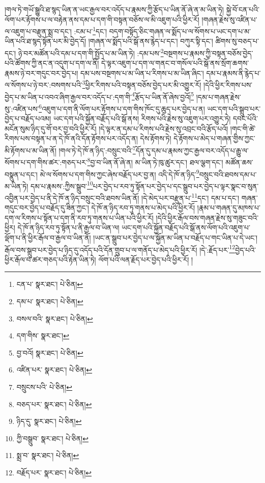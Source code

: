།གལ་ཏེ་གཡོ་སྒྱུའི་ཐ་སྙད་ཡིན་ན་ཡང་རྒྱལ་བར་འདོད་པ་རྣམས་ཀྱི་རྩོད་པ་ཡིན་ནོ་ཞེ་ན་མ་ཡིན་ཏེ། སྐྱེ་བོ་ངན་པའི་ལོག་པར་རྟོགས་པ་ལ་བརྟེན་ནས་དམ་པ་དག་གི་བསྟན་བཅོས་ལ་མི་འཇུག་པའི་ཕྱིར་རོ། །གཞན་རྗེས་སུ་འཛིན་པ་ལ་འཇུག་པ་བརྫུན་སྨྲ་བ་དང་། :ངམ་པ་\footnote{ངན་པ་  སྣར་ཐང་།  པེ་ཅིན། }དང་། བདག་བསྟོད་ཅིང་གཞན་ལ་སྨོད་པ་ལ་སོགས་པ་ཡང་དག་པ་མ་ཡིན་པའི་ཐ་སྙད་སྟོན་པར་མི་བྱེད་དོ། །གཞན་ལ་སྨོད་པའི་སྒོ་ནས་རྙེད་པ་དང་། བཀུར་སྟི་དང་། ཚིགས་སུ་བཅད་པ་དང་། ཉེ་བར་མཚོན་པའི་དམ་པ་དག་གི་སྤྱོད་པ་མ་ཡིན་ཏེ། :དམ་པས་\footnote{དམ་པ་  སྣར་ཐང་།  པེ་ཅིན། }བསྔགས་པ་རྣམས་ཀྱི་བསྟན་བཅོས་བྱེད་པའི་ཚོགས་ཀྱི་ནང་ན་འདུག་པ་དག་ལ་ནི། དེ་ལྟར་འཇུག་པ་དག་ལ་གནང་བ་གསོལ་པའི་སྒོ་ནས་སྲོག་ཆགས་རྣམས་ཉེ་བར་གདུང་བར་བྱེད་པ། དམ་པས་བསྔགས་པ་མ་ཡིན་པ་རིགས་པ་མ་ཡིན་ཞིང་། དམ་པ་རྣམས་ནི་རྙེད་པ་ལ་སོགས་པ་ཉེ་བར་:བསགས་པའི་\footnote{བསལ་བའི་  སྣར་ཐང་།  པེ་ཅིན། }ཕྱིར་རིགས་པའི་བསྟན་བཅོས་བྱེད་པར་མི་འགྱུར་རོ། །དེའི་ཕྱིར་རིགས་པས་བྱེད་པ་མ་ཡིན་པ་འབའ་ཞིག་རྒྱལ་བར་འདོད་པ་:དག་གི་\footnote{དག་གིས་  སྣར་ཐང་། }རྩོད་པ་ཡིན་ནོ་ཞེས་བྱའོ།\footnote{བྱ་བའོ།  སྣར་ཐང་།  པེ་ཅིན། } །དམ་པ་གཞན་རྗེས་སུ་:འཛིན་པས་\footnote{འཛིན་པར་  སྣར་ཐང་།  པེ་ཅིན། }འཇུག་པ་དག་ནི་ལོག་པར་རྟོགས་པ་དག་གིས་ཁོང་དུ་ཆུད་པར་བྱེད་པ་ན། ཡང་དག་པའི་སྒྲུབ་པར་བྱེད་པ་བརྗོད་པའམ། ཡང་དག་པའི་སྐྱོན་བརྗོད་པའི་སྒོ་ནས། རིགས་པའི་རྗེས་སུ་འཇུག་པར་འགྱུར་ཏེ། དབང་པོའི་མངོན་སུམ་ཉིད་དུ་གོ་བར་བྱ་བའི་ཕྱིར་རོ། །དེ་ལྟར་ན་དམ་པ་རིགས་པའི་རྗེས་སུ་འབྲང་བའི་རྩོད་པའོ། །གང་གི་ཚེ་རིགས་པས་བསྟན་པ་ན་དེ་ཁོ་ནའི་དོན་རྟོགས་པར་འདོད་ན། དེས་རྟོགས་ཏེ། དེ་རྟོགས་པ་མེད་པ་གཞན་གྱིས་ཀྱང་མི་རྟོགས་པ་མ་ཡིན་ནོ། །གལ་ཏེ་དེ་ཁོ་ན་ཉིད་:བསྲུང་བའི་\footnote{བསྲུངས་པའི་  པེ་ཅིན། }དོན་དུ་དམ་པ་རྣམས་ཀྱང་རྒྱལ་བར་འདོད་པ་རྒྱུ་ལ་སོགས་པ་དག་གིས་ཚར་:གཅད་པར་\footnote{བཅད་པར་  སྣར་ཐང་།  པེ་ཅིན། }བྱ་བ་ཡིན་ནོ་ཞེ་ན། མ་ཡིན་ཏེ་ཁུ་ཚུར་དང་། ཐལ་ལྕག་དང་། མཚོན་ཆས་བསྣུན་པ་དང་། མེ་ལ་སོགས་པ་དག་གིས་ཀྱང་ཞེས་བརྗོད་པར་བྱ་ན། འདི་དེ་ཁོ་ན་ཉིད་\footnote{ཉིད་དུ་  སྣར་ཐང་།  པེ་ཅིན། }བསྲུང་བའི་ཐབས་དམ་པ་མ་ཡིན་ཏེ། དམ་པ་རྣམས་:ཀྱིས་སྒྲུབ་\footnote{ཀྱི་བསྒྲུབ་  སྣར་ཐང་།  པེ་ཅིན། }པར་བྱེད་པ་རབ་ཏུ་སྟོན་པར་བྱེད་པ་དང་སྒྲུབ་པར་བྱེད་པ་ལྟར་སྣང་བ་སུན་འབྱིན་པར་བྱེད་པ་ནི་དེ་ཁོ་ན་ཉིད་བསྲུང་བའི་ཐབས་ཡིན་ནོ། །དེ་མེད་པར་བརྫུན་པ་\footnote{སྨྲ་བ་  སྣར་ཐང་།  པེ་ཅིན། }དང་། དམ་པ་དང་། གཞན་གདུང་བར་བྱེད་པ་བརྗོད་དུ་ཟིན་ཀྱང་། དེ་ཁོ་ན་ཉིད་རབ་ཏུ་གནས་པ་མེད་པའི་ཕྱིར་རོ། །རྣམ་པ་གཞན་དུ་མཁས་པ་དག་ལ་རིགས་པ་སྟོན་པ་དག་ནི་རབ་ཏུ་གནས་པ་ཡིན་པའི་ཕྱིར་རོ། །དེའི་ཕྱིར་རྒོལ་བས་གཞན་རྗེས་སུ་གཟུང་བའི་ཕྱིར། དེ་ཁོ་ན་ཉིད་རབ་ཏུ་སྟོན་པ་ནི་རྒྱལ་བ་ཡིན་ལ། ཡང་དག་པའི་སྐྱོན་བརྗོད་པའི་སྒོ་ནས་ལོག་པའི་འཇུག་པ་ལྡོག་པ་ནི་ཕྱིར་རྒོལ་བ་རྒྱལ་བ་ཡིན་ནོ། །ཡང་ན་སྒྲུབ་པར་བྱེད་པ་ལ་སྐྱོན་མ་ཡིན་པ་བརྗོད་པ་གང་ཡིན་པ་དེ་ཡང་། རྒོལ་བས་སྒྲུབ་པར་བྱེད་པ་ཉིད་དུ་འདོད་པའི་དོན་གྲུབ་པ་ལ་གནོད་པ་མེད་པའི་ཕྱིར་རོ། །དེ་:རྗོད་པར་\footnote{བརྗོད་པར་  སྣར་ཐང་།  པེ་ཅིན། }བྱེད་པའི་ཕྱིར་རྒོལ་བ་ཚར་གཅད་པའི་རྟེན་ཡིན་ཏེ། ལོག་པའི་ལན་རྗོད་པར་བྱེད་པའི་ཕྱིར་རོ། །
